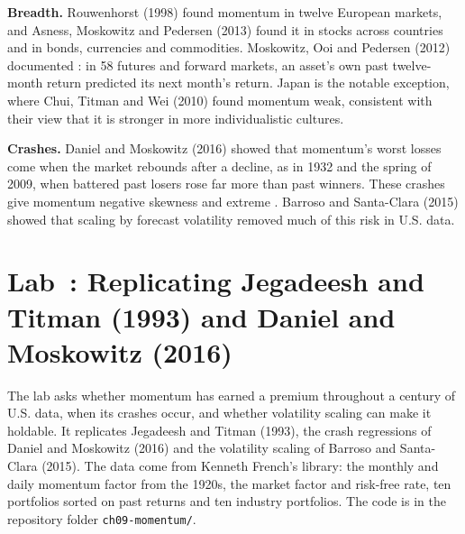 \textbf{Breadth.} Rouwenhorst (1998) found momentum in twelve European markets, and Asness, Moskowitz and Pedersen (2013) found it in stocks across countries and in bonds, currencies and commodities. Moskowitz, Ooi and Pedersen (2012) documented : in 58 futures and forward markets, an asset's own past twelve-month return predicted its next month's return. Japan is the notable exception, where Chui, Titman and Wei (2010) found momentum weak, consistent with their view that it is stronger in more individualistic cultures.

\textbf{Crashes.} Daniel and Moskowitz (2016) showed that momentum's worst losses come when the market rebounds after a decline, as in 1932 and the spring of 2009, when battered past losers rose far more than past winners. These crashes give momentum negative skewness and extreme . Barroso and Santa-Clara (2015) showed that scaling by forecast volatility removed much of this risk in U.S. data.

\section{Lab~\thechapter: Replicating Jegadeesh and Titman (1993) and Daniel and Moskowitz (2016)}
\label{sec:05-lab}

The lab asks whether momentum has earned a premium throughout a century of U.S. data, when its crashes occur, and whether volatility scaling can make it holdable. It replicates Jegadeesh and Titman (1993), the crash regressions of Daniel and Moskowitz (2016) and the volatility scaling of Barroso and Santa-Clara (2015). The data come from Kenneth French's library: the monthly and daily momentum factor from the 1920s, the market factor and risk-free rate, ten portfolios sorted on past returns and ten industry portfolios. The code is in the repository folder \texttt{ch09-momentum/}.

